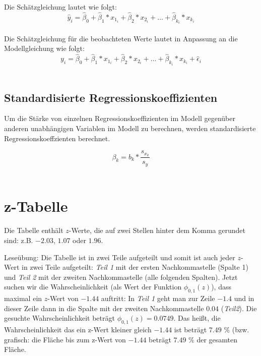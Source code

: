 \documentclass[11pt,a4paper]{article}
\begin{document}
Die Schätzgleichung lautet wie folgt:\\
$$\hat{y}_i = \hat{\beta}_0 + \hat{\beta}_1 \ast x_{1_i} + \hat{\beta}_2 \ast x_{2_i} + ... + \hat{\beta}_{k_i} \ast x_{k_i}$$ \\

Die Schätzgleichung für die beobachteten Werte lautet in Anpassung an die Modellgleichung wie folgt: \\
$$y_i = \hat{\beta}_0 + \hat{\beta}_1 \ast x_{1_i} + \hat{\beta}_2 \ast x_{2_i} + ... + \hat{\beta}_{k_i} \ast x_{k_i} + \hat{\epsilon}_i$$ \\


\subsection{Standardisierte Regressionskoeffizienten}
Um die Stärke von einzelnen Regressionskoeffizienten im Modell gegenüber anderen unabhängigen Variablen im Modell zu berechnen, werden standardisierte Regressionskoeffzienten berechnet. 

$$\beta_k = b_k * \frac{s_{x_k}}{s_y}$$ \\

\newpage
\section{z-Tabelle}
Die Tabelle enthält $z$-Werte, die auf zwei Stellen hinter dem Komma gerundet sind: z.B. $-2.03$, $1.07$ oder $1.96$. 

Leseübung: Die Tabelle ist in zwei Teile aufgeteilt und somit ist auch jeder $z$-Wert in zwei Teile aufgeteilt: \textit{Teil 1} mit der ersten Nachkommastelle (Spalte 1) und \textit{Teil 2} mit der zweiten Nachkommastelle (alle folgenden Spalten). Jetzt suchen wir die Wahrscheinlichkeit (als Wert der Funktion $\phi_{0,1} (z)$), dass maximal ein $z$-Wert von $-1.44$ auftritt: In \textit{Teil 1} geht man zur Zeile $-1.4$ und in dieser Zeile dann in die Spalte mit der zweiten Nachkommastelle $0.04$ (\textit{Teil2}). Die gesuchte Wahrscheinlichkeit beträgt $\phi_{0,1}(z) = 0.0749$. Das heißt, die Wahrscheinlichkeit das ein z-Wert kleiner gleich $-1.44$ ist beträgt $7.49$ \% (bzw. grafisch: die Fläche bis zum z-Wert von $-1.44$ beträgt $7.49$ \% der gesamten Fläche.\\
\end{document}
